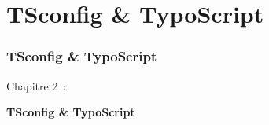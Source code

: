 %

\section{TSconfig \& TypoScript}
\begin{frame}[fragile]
	\frametitle{TSconfig \& TypoScript}

	\begin{center}\huge{Chapitre 2~:}\end{center}
	\begin{center}\huge{\color{typo3darkgrey}\textbf{TSconfig \& TypoScript}}\end{center}

\end{frame}

